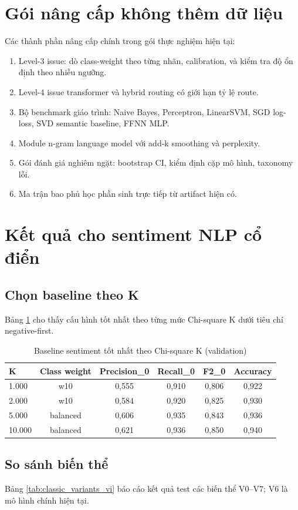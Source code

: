 ﻿\documentclass[12pt,a4paper]{article}
\begin{document}
\section{Gói nâng cấp không thêm dữ liệu}
Các thành phần nâng cấp chính trong gói thực nghiệm hiện tại:
\begin{enumerate}
\item Level-3 issue: dò class-weight theo từng nhãn, calibration, và kiểm tra độ ổn định theo nhiễu ngưỡng.
\item Level-4 issue transformer và hybrid routing có giới hạn tỷ lệ route.
\item Bộ benchmark giáo trình: Naive Bayes, Perceptron, LinearSVM, SGD log-loss, SVD semantic baseline, FFNN MLP.
\item Module n-gram language model với add-k smoothing và perplexity.
\item Gói đánh giá nghiêm ngặt: bootstrap CI, kiểm định cặp mô hình, taxonomy lỗi.
\item Ma trận bao phủ học phần sinh trực tiếp từ artifact hiện có.
\end{enumerate}

\section{Kết quả cho sentiment NLP cổ điển}
\subsection{Chọn baseline theo K}
Bảng \ref{tab:chi2_k_vi} cho thấy cấu hình tốt nhất theo từng mức Chi-square K dưới tiêu chí negative-first.

\begin{table}[H]
\centering
\caption{Baseline sentiment tốt nhất theo Chi-square K (validation)}
\label{tab:chi2_k_vi}
\begin{tabular}{lccccc}
\toprule
K & Class weight & Precision\_0 & Recall\_0 & F2\_0 & Accuracy \\
\midrule
1.000 & w10 & 0,555 & 0,910 & 0,806 & 0,922 \\
2.000 & w10 & 0,584 & 0,920 & 0,825 & 0,930 \\
5.000 & balanced & 0,606 & 0,935 & 0,843 & 0,936 \\
10.000 & balanced & 0,621 & 0,936 & 0,850 & 0,940 \\
\bottomrule
\end{tabular}
\end{table}

\subsection{So sánh biến thể}
Bảng \ref{tab:classic_variants_vi} báo cáo kết quả test các biến thể V0--V7; V6 là mô hình chính hiện tại.
\end{document}
